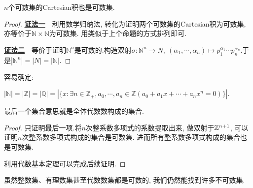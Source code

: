 \begin{proposition}{}
	$n$个可数集的Cartesian积也是可数集.
\end{proposition}
\begin{remark}
	可数个可数集的Cartesian积未必是可数集. 一个简明(但不尽严谨)的例子是, 考虑在$\{ 0,1 \} \times \cdots \times { 0,1 \} \times \cdots$与$(0,1) =\{ 0.a_1\cdots a_n \cdots : a_i \in \{ 0,1 \}, i \geq 1 \}$之间建立双射. 
\end{remark}
\begin{proof}
	\underline{\textbf{证法一}}~~利用数学归纳法, 转化为证明两个可数集的Cartesian积为可数集, 亦等价于$\mathbb{N} \times \mathbb{N}$为可数集. 用类似于上个命题的方式排列即可. 
	
	\underline{\textbf{证法二}}~~等价于证明$\mathbb{N}^n$是可数的.构造双射$\sigma : \mathbb{N}^n \to N, ~(\alpha _1,  \cdots , \alpha _n) \mapsto p_1^{\alpha _1} \cdots p_n^{\alpha _n}$.于是$|\mathbb{N}^n| = |N| = |\mathbb{N}|$.
\end{proof}

容易确定: 

\begin{proposition}
	$|\mathbb{N}| = |\mathbb{Z}| = |\mathbb{Q}| = | \{ x: \exists n \in \mathbb{Z}_+, a_0,  \cdots , a_n \in \mathbb{Z}(a_0+a_1x+\cdots +a_nx^n=0) \} |$.
\end{proposition}
\begin{remark}
	最后一个集合意思就是全体代数数构成的集合.
\end{remark}
\begin{proof}
	只证明最后一项.将$n$次整系数多项式的系数提取出来, 做双射于$\mathbb{Z} ^{n+1}$, 可以证明$n$次整系数多项式构成的集合是可数集. 进而所有整系数多项式构成的集合也是可数集. 
	
	利用代数基本定理可以完成后续证明. 
\end{proof}

虽然整数集、有理数集甚至代数数集都是可数的, 我们仍然能找到许多不可数集.

